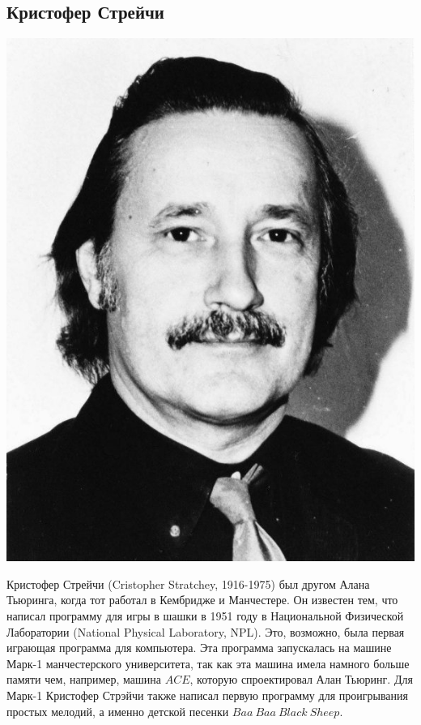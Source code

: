 \documentclass[14pt]{matmex-diploma-custom}
\begin{document}
\subsection{Кристофер Стрейчи}
\includegraphics[angle=0,scale=0.2]{stratchey.jpg}

Кристофер Стрейчи (Cristopher Stratchey, 1916-1975) был другом Алана Тьюринга, когда тот работал в Кембридже и Манчестере. Он известен тем, что написал программу для игры в шашки в 1951 году в Национальной Физической Лаборатории (National Physical Laboratory, NPL). Это, возможно, была первая играющая программа для компьютера. Эта программа запускалась на машине Марк-1 манчестерского университета, так как эта машина имела намного больше памяти чем, например, машина $ACE$, которую спроектировал Алан Тьюринг. Для Марк-1 Кристофер Стрэйчи также написал первую программу для проигрывания простых мелодий, а именно детской песенки $Baa\ Baa\ Black\ Sheep$.
\end{document}
